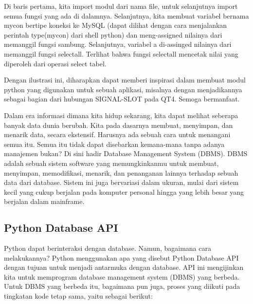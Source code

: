 Di baris pertama, kita import modul dari nama file, untuk selanjutnya import semua fungsi yang ada di dalamnya. Selanjutnya, kita membuat variabel bernama mycon bertipe koneksi ke MySQL (dapat dilihat dengan cara menjalankan perintah type(mycon) dari shell python) dan meng-assigned nilainya dari memanggil fungsi sambung. Selanjutnya, variabel a di-assinged nilainya dari memanggil fungsi selectall. Terlihat bahwa fungsi selectall mencetak nilai yang diperoleh dari operasi select tabel. 
\vspace{12pt}

Dengan ilustrasi ini, diharapkan dapat memberi inspirasi dalam membuat modul python yang digunakan untuk sebuah aplikasi, misalnya dengan menjadikannya sebagai bagian dari hubungan SIGNAL-SLOT pada QT4. Semoga bermanfaat. 
\vspace{12pt}

Dalam era informasi dimana kita hidup sekarang, kita dapat melihat seberapa banyak data dunia berubah. Kita pada dasarnya membuat, menyimpan, dan menarik data, secara ekstensif. Harusnya ada sebuah cara untuk menangani semua itu. Semua itu tidak dapat disebarkan kemana-mana tanpa adanya manajemen bukan? Di sini hadir Database Management System (DBMS). DBMS adalah sebuah sistem software yang memungkinkanmu untuk membuat, menyimpan, memodifikasi, menarik, dan penanganan lainnya terhadap sebuah data dari database. Sistem ini juga bervariasi dalam ukuran, mulai dari sistem kecil yang cukup berjalan pada komputer personal hingga yang lebih besar yang berjalan dalam mainframe. 
\vspace{12pt}
\noindent 

\subsection{Python Database API} 
Python dapat berinteraksi dengan database. Namun, bagaimana cara melakukannya? Python menggunakan apa yang disebut Python Database API dengan tujuan untuk menjadi antarmuka dengan database. API ini mengijinkan kita untuk memprogram database management system (DBMS) yang berbeda. Untuk DBMS yang berbeda itu, bagaimana pun juga, proses yang diikuti pada tingkatan kode tetap sama, yaitu sebagai berikut: 
\vspace{12pt}
\noindent 

